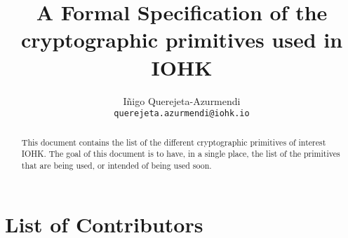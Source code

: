 \cleardoublepage%
  \tableofcontents%

  \listoffigures%
  \clearpage%

\title{A Formal Specification of the cryptographic primitives used in IOHK}

\author{I\~{n}igo Querejeta-Azurmendi  \\ {\small \texttt{querejeta.azurmendi@iohk.io}}}


\maketitle

\begin{abstract}
This document contains the list of the different cryptographic primitives of interest IOHK. The 
goal of this document is to have, in a single place, the list of the primitives that are being used, 
or intended of being used soon. 
\end{abstract}

\section*{List of Contributors}
\label{acknowledgements}
